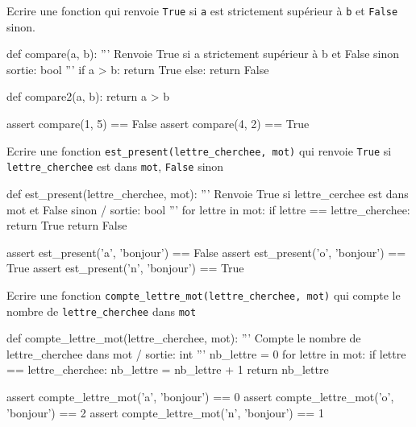\documentclass[a4paper,10pt]{report}
\def\ptsexoC{2}
\def\ptsexoD{2}
\def\ptsexoE{2}
\begin{document}
    \medskip

\exods{\ptsexoC}

Ecrire une fonction qui renvoie \verb|True| si \verb|a| est strictement supérieur à \verb|b| et \verb|False| sinon.

\begin{CodePythontexAlt}[TaillePolice=\large,Largeur=1\linewidth,Centre,PremLigne=1]{}
def compare(a, b):
    ''' Renvoie True si a strictement supérieur à b et False sinon
    sortie: bool '''
    if a > b:
        return True
    else:
        return False

def compare2(a, b):
    return a > b

assert compare(1, 5) == False
assert compare(4, 2) == True
    \end{CodePythontexAlt}

 \pagebreak
    \pagestyle{DS_LP}

\exods{\ptsexoD}

Ecrire une fonction \verb|est_present(lettre_cherchee, mot)| qui renvoie \verb|True| si \verb|lettre_cherchee| est dans \verb|mot|, \verb|False| sinon

\begin{CodePythontexAlt}[TaillePolice=\large,Largeur=1\linewidth,Centre,PremLigne=1]{}
def est_present(lettre_cherchee, mot):
    ''' Renvoie True si lettre_cerchee est dans mot et False sinon / sortie: bool '''
    for lettre in mot:
        if lettre == lettre_cherchee:
            return True
    return False

assert est_present('a', 'bonjour') == False
assert est_present('o', 'bonjour') == True
assert est_present('n', 'bonjour') == True

    \end{CodePythontexAlt}

    \medskip

    \exods{\ptsexoE}


Ecrire une fonction \verb|compte_lettre_mot(lettre_cherchee, mot)| qui compte le nombre de \verb|lettre_cherchee| dans \verb|mot|

\begin{CodePythontexAlt}[TaillePolice=\large,Largeur=1\linewidth,Centre,PremLigne=1]{}
def compte_lettre_mot(lettre_cherchee, mot):
    ''' Compte le nombre de lettre_cherchee dans mot / sortie: int '''
    nb_lettre = 0
    for lettre in mot:
        if lettre == lettre_cherchee:
            nb_lettre = nb_lettre + 1
    return nb_lettre

assert compte_lettre_mot('a', 'bonjour') == 0
assert compte_lettre_mot('o', 'bonjour') == 2
assert compte_lettre_mot('n', 'bonjour') == 1
    \end{CodePythontexAlt}
\end{document}
